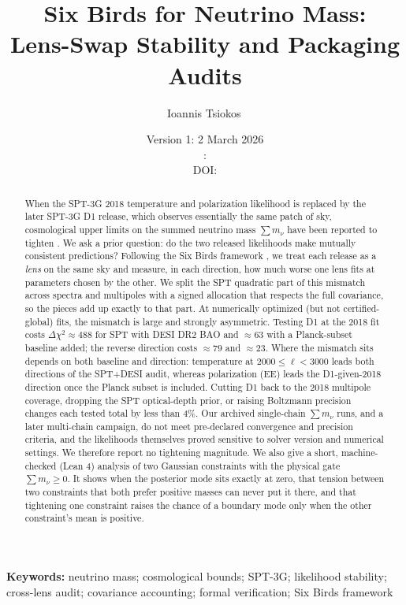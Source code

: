 \documentclass[11pt]{article}
\title{Six Birds for Neutrino Mass:\texorpdfstring{\\}{ } Lens-Swap Stability and Packaging Audits}
\author{Ioannis Tsiokos\,\orcidlink{0009-0009-7659-5964}}
\affiliation{}
\date{Version 1: 2 March 2026\\[2pt]\manuscriptversion: \manuscriptdate\ifpaperhasdoi\\[4pt]{\small DOI: \href{https://doi.org/\paperdoi}{\paperdoi}}\fi}
\makeatletter
\theoremstyle{remark}
\newcommand{\dchi}{\Delta \chi^2}
\newcommand{\mnu}{\sum m_\nu}
\numberwithin{equation}{section}
\newcommand{\printaffiliation}{\begin{center}\small \@affiliation\end{center}}
\makeatother
\begin{document}
\maketitle
\thispagestyle{firstpage}
\printaffiliation

\begin{abstract}
\label{sec:abstract}
When the SPT-3G 2018 temperature and polarization likelihood is replaced by the later SPT-3G D1 release, which observes essentially the same patch of sky, cosmological upper limits on the summed neutrino mass $\mnu$ have been reported to tighten \cite{arxiv2601_16277}. We ask a prior question: do the two released likelihoods make mutually consistent predictions? Following the Six Birds framework \cite{sixbirds_foundations,sixbirds_darkenergy}, we treat each release as a \emph{lens} on the same sky and measure, in each direction, how much worse one lens fits at parameters chosen by the other. We split the SPT quadratic part of this mismatch across spectra and multipoles with a signed allocation that respects the full covariance, so the pieces add up exactly to that part. At numerically optimized (but not certified-global) fits, the mismatch is large and strongly asymmetric. Testing D1 at the 2018 fit costs $\dchi\approx488$ for SPT with DESI DR2 BAO and $\approx63$ with a Planck-subset baseline added; the reverse direction costs $\approx79$ and $\approx23$. Where the mismatch sits depends on both baseline and direction: temperature at $2000\le\ell<3000$ leads both directions of the SPT+DESI audit, whereas polarization (EE) leads the D1-given-2018 direction once the Planck subset is included. Cutting D1 back to the 2018 multipole coverage, dropping the SPT optical-depth prior, or raising Boltzmann precision changes each tested total by less than 4\%. Our archived single-chain $\mnu$ runs, and a later multi-chain campaign, do not meet pre-declared convergence and precision criteria, and the likelihoods themselves proved sensitive to solver version and numerical settings. We therefore report no tightening magnitude. We also give a short, machine-checked (Lean 4) analysis of two Gaussian constraints with the physical gate $\mnu\ge0$. It shows when the posterior mode sits exactly at zero, that tension between two constraints that both prefer positive masses can never put it there, and that tightening one constraint raises the chance of a boundary mode only when the other constraint's mean is positive.
 \end{abstract}

\noindent\textbf{Keywords:} neutrino mass; cosmological bounds; SPT-3G; likelihood stability; cross-lens audit; covariance accounting; formal verification; Six Birds framework
\end{document}
